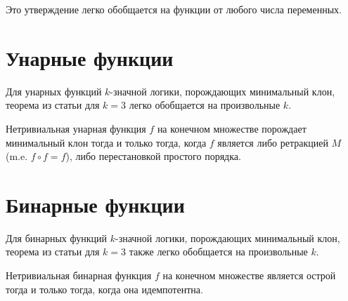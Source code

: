\documentclass{article}
\begin{document}
	Это утверждение легко обобщается на функции от любого числа переменных.

\section{Унарные функции}
	Для унарных функций $k$-значной логики, порождающих минимальный клон,
		теорема из статьи для $k=3$ легко обобщается на произвольные $k$.

	Нетривиальная унарная функция $f$ на конечном множестве порождает минимальный клон тогда и только тогда,
		когда $f$ является либо ретракцией $M$ (m.e. $f \circ f = f$), либо перестановкой простого порядка.
\section{Бинарные функции}
	Для бинарных функций $k$-значной логики, порождающих минимальный клон,
		теорема из статьи для $k=3$ также легко обобщается на произвольные $k$.

	Нетривиальная бинарная функция $f$ на конечном множестве является острой тогда и только тогда,
		когда она идемпотентна.
\end{document}
